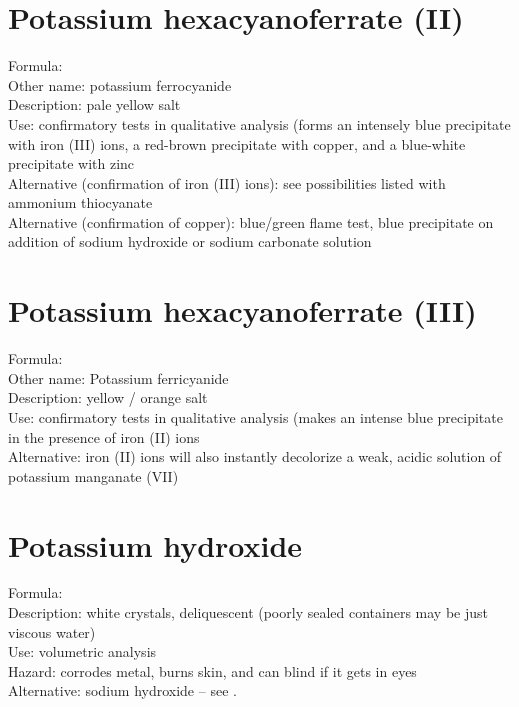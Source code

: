 \section{Potassium hexacyanoferrate (II)}
\label{sec:}
Formula: \\
Other name: potassium ferrocyanide\\
Description: pale yellow salt\\
Use: confirmatory tests in qualitative analysis 
(forms an intensely blue precipitate with iron (III) ions, 
a red-brown precipitate with copper, 
and a blue-white precipitate with zinc\\
Alternative (confirmation of iron (III) ions): 
see possibilities listed with ammonium thiocyanate\\
Alternative (confirmation of copper): blue/green flame test, 
blue precipitate on addition of sodium hydroxide 
or sodium carbonate solution

\section{Potassium hexacyanoferrate (III)}
\label{sec:}
Formula: \\
Other name: Potassium ferricyanide\\
Description: yellow / orange salt\\
Use: confirmatory tests in qualitative analysis 
(makes an intense blue precipitate in the presence of iron (II) ions\\
Alternative: iron (II) ions will also instantly decolorize a weak, 
acidic solution of potassium manganate (VII)

\section{Potassium hydroxide}
\label{sec:}
Formula: \\
Description: white crystals, 
deliquescent (poorly sealed containers may be just viscous water)\\
Use: volumetric analysis\\
Hazard: corrodes metal, 
burns skin, 
and can blind if it gets in eyes\\
Alternative: sodium hydroxide -- 
see .

